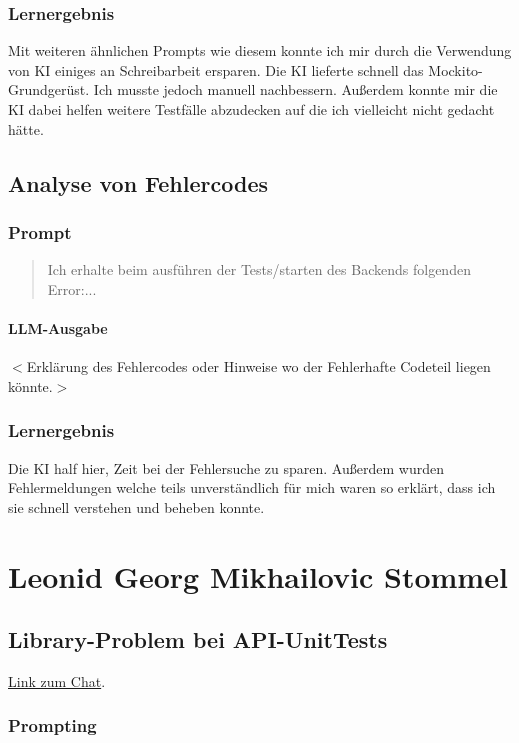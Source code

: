 \documentclass[12pt, a4paper]{scrreprt}
\begin{document}
	\subsection{Lernergebnis}
	Mit weiteren ähnlichen Prompts wie diesem konnte ich mir durch die Verwendung von KI einiges an Schreibarbeit ersparen. Die KI lieferte schnell das Mockito-Grundgerüst. Ich musste jedoch manuell nachbessern. Außerdem konnte mir die KI dabei helfen weitere Testfälle abzudecken auf die ich vielleicht nicht gedacht hätte.

	\section{Analyse von Fehlercodes}

	\subsection{Prompt}

	\begin{quote}
		Ich erhalte beim ausführen der Tests/starten des Backends folgenden Error:...
	\end{quote}

	\subsubsection{LLM-Ausgabe}
	$<$Erklärung des Fehlercodes oder Hinweise wo der Fehlerhafte Codeteil liegen könnte.$>$

	\subsection{Lernergebnis}
	Die KI half hier, Zeit bei der Fehlersuche zu sparen. Außerdem wurden Fehlermeldungen welche teils unverständlich für mich waren so erklärt, dass ich sie schnell verstehen und beheben konnte.

	\chapter{Leonid Georg Mikhailovic Stommel}

	\section{Library-Problem bei API-UnitTests}

	\href{https://gemini.google.com/share/6b4ea303c9ce}{Link zum Chat}.

	\subsection{Prompting}
\end{document}
